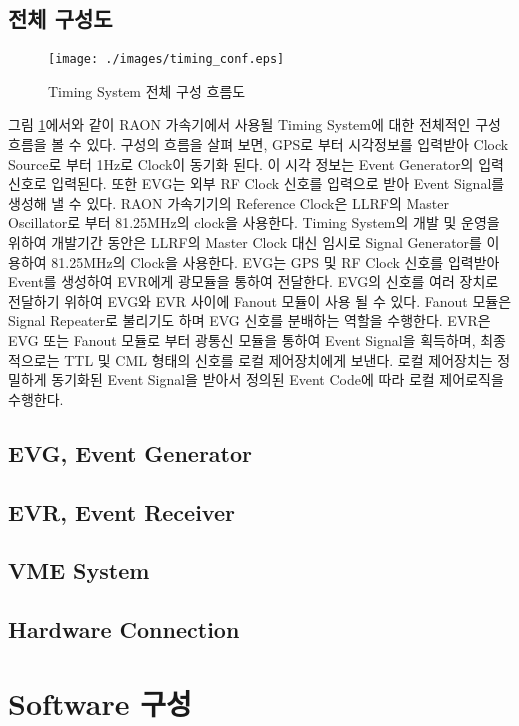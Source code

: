 \documentclass[11pt
  , a4paper
  , article
  , oneside
]{memoir}
\begin{document}
\section{전체 구성도}
\begin{figure}[h!]
	\centering
	\texttt{[image: ./images/timing\_conf.eps]}
	\caption{Timing System 전체 구성 흐름도}
	\label{fig:timing_conf} 
\end{figure}
 그림 \ref{fig:timing_conf}에서와 같이 RAON 가속기에서 사용될 Timing System에 대한 전체적인 구성 흐름을 볼 수 있다. 구성의 흐름을 살펴 보면, GPS로 부터 시각정보를 입력받아 Clock Source로 부터 1Hz로 Clock이 동기화 된다. 이 시각 정보는 Event Generator의 입력신호로 입력된다. 또한 EVG는 외부 RF Clock 신호를 입력으로 받아 Event Signal를 생성해 낼 수 있다. RAON 가속기기의 Reference Clock은 LLRF의 Master Oscillator로 부터 81.25MHz의 clock을 사용한다. Timing System의 개발 및 운영을 위하여 개발기간 동안은 LLRF의 Master Clock 대신 임시로 Signal Generator를 이용하여 81.25MHz의 Clock을 사용한다. EVG는 GPS 및 RF Clock 신호를 입력받아 Event를 생성하여 EVR에게 광모듈을 통하여 전달한다. EVG의 신호를 여러 장치로 전달하기 위하여 EVG와 EVR 사이에 Fanout 모듈이 사용 될 수 있다. Fanout 모듈은 Signal Repeater로 불리기도 하며 EVG 신호를 분배하는 역할을 수행한다. EVR은 EVG 또는 Fanout 모듈로 부터 광통신 모듈을 통하여 Event Signal을 획득하며, 최종적으로는 TTL 및 CML 형태의 신호를 로컬 제어장치에게 보낸다. 로컬 제어장치는 정밀하게 동기화된 Event Signal을 받아서 정의된 Event Code에 따라 로컬 제어로직을 수행한다.
 
\section{EVG, Event Generator}

\section{EVR, Event Receiver}

\section{VME System}

\section{Hardware Connection}

\clearpage

\chapter{Software 구성}
\end{document}
